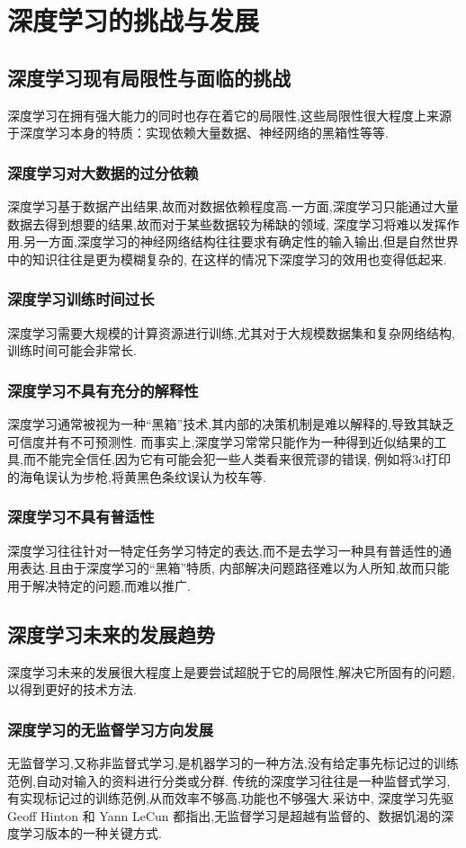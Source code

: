 \documentclass[UTF8]{ctexbook}
\begin{document}
\chapter{深度学习的挑战与发展}
\section{深度学习现有局限性与面临的挑战}
深度学习在拥有强大能力的同时也存在着它的局限性,这些局限性很大程度上来源于深度学习本身的特质：实现依赖大量数据、神经网络的黑箱性等等.
\subsection{深度学习对大数据的过分依赖}
深度学习基于数据产出结果,故而对数据依赖程度高.一方面,深度学习只能通过大量数据去得到想要的结果,故而对于某些数据较为稀缺的领域,
深度学习将难以发挥作用.另一方面,深度学习的神经网络结构往往要求有确定性的输入输出,但是自然世界中的知识往往是更为模糊复杂的,
在这样的情况下深度学习的效用也变得低起来.
\subsection{深度学习训练时间过长}
深度学习需要大规模的计算资源进行训练,尤其对于大规模数据集和复杂网络结构,训练时间可能会非常长.
\subsection{深度学习不具有充分的解释性}
深度学习通常被视为一种“黑箱”技术,其内部的决策机制是难以解释的,导致其缺乏可信度并有不可预测性.
而事实上,深度学习常常只能作为一种得到近似结果的工具,而不能完全信任,因为它有可能会犯一些人类看来很荒谬的错误,
例如将3d打印的海龟误认为步枪,将黄黑色条纹误认为校车等.
\subsection{深度学习不具有普适性}
深度学习往往针对一特定任务学习特定的表达,而不是去学习一种具有普适性的通用表达.且由于深度学习的“黑箱”特质,
内部解决问题路径难以为人所知,故而只能用于解决特定的问题,而难以推广.
\clearpage
\section{深度学习未来的发展趋势}
深度学习未来的发展很大程度上是要尝试超脱于它的局限性,解决它所固有的问题,以得到更好的技术方法.
\subsection{深度学习的无监督学习方向发展}
无监督学习,又称非监督式学习,是机器学习的一种方法,没有给定事先标记过的训练范例,自动对输入的资料进行分类或分群.
传统的深度学习往往是一种监督式学习,有实现标记过的训练范例,从而效率不够高,功能也不够强大.采访中,
深度学习先驱Geoff Hinton 和 Yann LeCun 都指出,无监督学习是超越有监督的、数据饥渴的深度学习版本的一种关键方式.
\end{document}
